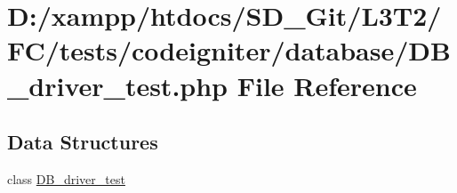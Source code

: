 \hypertarget{_d_b__driver__test_8php}{}\section{D\+:/xampp/htdocs/\+S\+D\+\_\+\+Git/\+L3\+T2/\+F\+C/tests/codeigniter/database/\+D\+B\+\_\+driver\+\_\+test.php File Reference}
\label{_d_b__driver__test_8php}
\subsection*{Data Structures}
\begin{DoxyCompactItemize}
\item 
class \hyperlink{class_d_b__driver__test}{D\+B\+\_\+driver\+\_\+test}
\end{DoxyCompactItemize}
